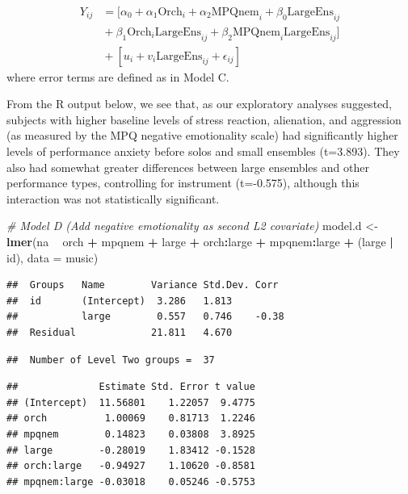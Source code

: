 \documentclass[
]{krantz}
\newenvironment{Shaded}{\begin{snugshade}}{\end{snugshade}}
\newcommand{\CommentTok}[1]{\textcolor[rgb]{0.37,0.37,0.37}{\textit{#1}}}
\newcommand{\DataTypeTok}[1]{\textcolor[rgb]{0.27,0.27,0.27}{#1}}
\newcommand{\KeywordTok}[1]{\textcolor[rgb]{0.27,0.27,0.27}{\textbf{#1}}}
\newcommand{\NormalTok}[1]{#1}
\newcommand{\OperatorTok}[1]{\textcolor[rgb]{0.43,0.43,0.43}{\textbf{#1}}}
\newcommand{\StringTok}[1]{\textcolor[rgb]{0.5,0.5,0.5}{#1}}
\begin{document}
\begin{align*}
Y_{ij} & = [\alpha_{0}+\alpha_{1}\textrm{Orch}_{i}+\alpha_{2}\textrm{MPQnem}_{i}+\beta_{0}\textrm{LargeEns}_{ij} \\
 & \textrm{} + \beta_{1}\textrm{Orch}_{i}\textrm{LargeEns}_{ij}+\beta_{2}\textrm{MPQnem}_{i}\textrm{LargeEns}_{ij}] \\
 & \textrm{} + [u_{i}+v_{i}\textrm{LargeEns}_{ij}+\epsilon_{ij}]
\end{align*}
where error terms are defined as in Model C.

From the R output below, we see that, as our exploratory analyses suggested, subjects with higher baseline levels of stress reaction, alienation, and aggression (as measured by the MPQ negative emotionality scale) had significantly higher levels of performance anxiety before solos and small ensembles (t=3.893). They also had somewhat greater differences between large ensembles and other performance types, controlling for instrument (t=-0.575), although this interaction was not statistically significant.

\begin{Shaded}
\begin{Highlighting}[]
\CommentTok{# Model D (Add negative emotionality as second L2 covariate)}
\NormalTok{model.d <-}\StringTok{ }\KeywordTok{lmer}\NormalTok{(na }\OperatorTok{~}\StringTok{ }\NormalTok{orch }\OperatorTok{+}\StringTok{ }\NormalTok{mpqnem }\OperatorTok{+}\StringTok{ }\NormalTok{large }\OperatorTok{+}\StringTok{ }\NormalTok{orch}\OperatorTok{:}\NormalTok{large }\OperatorTok{+}\StringTok{ }
\StringTok{  }\NormalTok{mpqnem}\OperatorTok{:}\NormalTok{large }\OperatorTok{+}\StringTok{ }\NormalTok{(large }\OperatorTok{|}\StringTok{ }\NormalTok{id), }\DataTypeTok{data =}\NormalTok{ music)}
\end{Highlighting}
\end{Shaded}

\begin{verbatim}
##  Groups   Name        Variance Std.Dev. Corr 
##  id       (Intercept)  3.286   1.813         
##           large        0.557   0.746    -0.38
##  Residual             21.811   4.670
\end{verbatim}

\begin{verbatim}
##  Number of Level Two groups =  37
\end{verbatim}

\begin{verbatim}
##              Estimate Std. Error t value
## (Intercept)  11.56801    1.22057  9.4775
## orch          1.00069    0.81713  1.2246
## mpqnem        0.14823    0.03808  3.8925
## large        -0.28019    1.83412 -0.1528
## orch:large   -0.94927    1.10620 -0.8581
## mpqnem:large -0.03018    0.05246 -0.5753
\end{verbatim}
\end{document}
